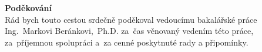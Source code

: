\newpage
\pagestyle{empty}

\noindent
{\large\bfseries Poděkování}\\

\noindent
Rád bych touto cestou srdečně poděkoval vedoucímu bakalářské práce Ing.~Markovi Beránkovi,~Ph.D.
za~čas věnovaný vedením této práce, za~příjemnou spolupráci a~za cenné poskytnuté rady a připomínky.
